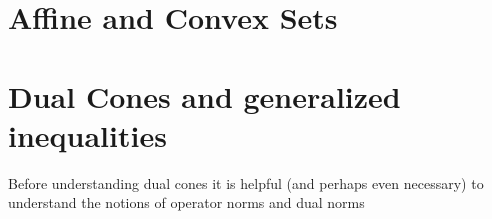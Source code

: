     
    \section{Affine and Convex Sets}

    \section{Dual Cones and generalized inequalities}
    Before understanding dual cones it is helpful (and perhaps even necessary) to 
    understand the notions of operator norms and dual norms





